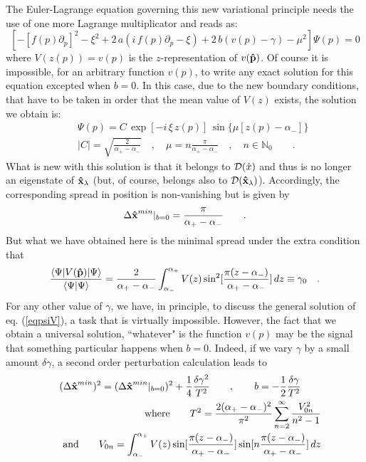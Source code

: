 \documentclass[a4paper,10pt]{article}
\newcommand{\x}{\mbox{\rm{\bf \^ x}}}
\newcommand{\p}{\mbox{\rm{\bf \^ p}}}
\newcommand{\xl}{\x_{\lambda}}
\newcommand{\cD}{{\cal D}}
\newcommand{\NN}{\mathbb N}
\begin{document}
The Euler-Lagrange equation governing this new variational
principle needs the use of one more Lagrange multiplicator and
reads as:
\begin{equation}
\left[-[f(p)\partial_p]^2-\xi^2+2\,a(i\,f(p)\partial_p-\xi)+
2\,b(v(p)-\gamma)-\mu^2\right]\Psi(p)=0\label{eqpsiV}
\end{equation} where $V(z(p))=v(p)$ is the $z$-representation of
$v(\p)$. Of course it is impossible, for an arbitrary function
$v(p)$, to write any exact solution for this equation excepted
when $b=0$. In this case, due to the new boundary conditions, that
have to be taken in order that the mean value of $V(z)$ exists,
the solution we obtain is:
\begin{eqnarray}
&&\Psi(p)=C\,\exp[-i\,\xi\,z(p)]\,\sin\{\mu[z(p)-\alpha_-]\}\\&&|C|=\sqrt{\frac2{\alpha_+-\alpha_-}}
\quad,\quad \mu=n\frac{\pi}{\alpha_+-\alpha_-}\quad,\quad n\in
\NN_0\qquad .\nonumber
\end{eqnarray} What is new with this solution is that it belongs to
$\cD(\hat x)$ and thus is no longer an eigenstate of $\xl$ (but,
of course, belongs also to $\cD(\xl)$). Accordingly, the
corresponding spread in position is non-vanishing but is given by
\begin{equation} \Delta
\x^{min}|_{b=0}=\frac{\pi}{\alpha_+-\alpha_-}\qquad.
\end{equation} But what we have obtained here is the minimal spread
under the extra condition that
\begin{equation}
\frac{\langle\Psi|V(\p)|\Psi\rangle}{\langle\Psi|\Psi\rangle}=\frac2{\alpha_+-\alpha_-}
\int_{\alpha_-}^{\alpha_+}V(z)\sin^2[\frac{\pi(z-\alpha_-)}{\alpha_+-\alpha_-}]\,dz\equiv\gamma_0\quad.
\end{equation} For any other value of $\gamma$, we have, in
principle, to discuss the general solution of eq. (\ref{eqpsiV}),
a task that is virtually impossible. However, the fact that we
obtain a universal solution, ``whatever" is the function $v(p)$
may be the signal that something particular happens when $b=0$.
Indeed, if we vary $\gamma$ by a small amount $\delta\gamma$, a
second order perturbation calculation \cite{LL} leads to
\begin{eqnarray} &&(\Delta \x^{min})^2=(\Delta
\x^{min}|_{b=0})^2+\frac14\frac{\delta\gamma^2}{T^2}\qquad,\qquad
b=-\frac12\frac{\delta\gamma}{T^2}\qquad
\\ &&{\rm where}\qquad
T^2=\frac{2(\alpha_+-\alpha_-)^2}{\pi^2}\sum_{n=2}^\infty\frac{V_{0n}^2}{n^2-1}\\
&& {\rm and}\qquad V_{0n}=
\int_{\alpha_-}^{\alpha_+}V(z)\sin[\frac{\pi(z-\alpha_-)}
{\alpha_+-\alpha_-}]
\sin[n\frac{\pi(z-\alpha_-)}{\alpha_+-\alpha_-}]\,dz
\end{eqnarray}
\end{document}
